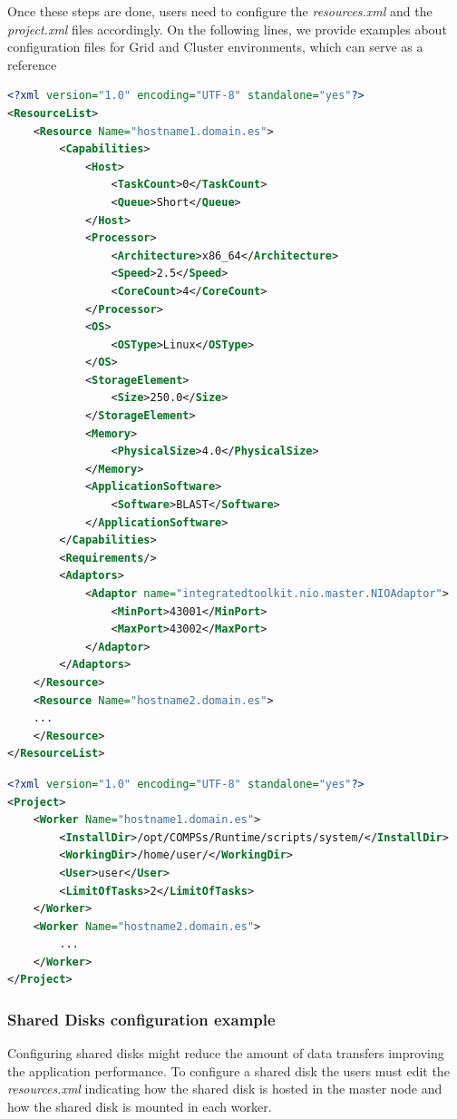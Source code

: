 Once these steps are done, users need to configure the \textit{resources.xml} and the \textit{project.xml} files accordingly.
On the following lines, we provide examples about configuration files for Grid and Cluster environments, 
which can serve as a reference

\begin{lstlisting}[language=xml]
<?xml version="1.0" encoding="UTF-8" standalone="yes"?>
<ResourceList>
    <Resource Name="hostname1.domain.es">
        <Capabilities>
            <Host>
                <TaskCount>0</TaskCount>
                <Queue>Short</Queue>
            </Host>
            <Processor>
                <Architecture>x86_64</Architecture>
                <Speed>2.5</Speed>
                <CoreCount>4</CoreCount>
            </Processor>
            <OS>
                <OSType>Linux</OSType>
            </OS>
            <StorageElement>
                <Size>250.0</Size>
            </StorageElement>
            <Memory>
                <PhysicalSize>4.0</PhysicalSize>
            </Memory>
            <ApplicationSoftware>
                <Software>BLAST</Software>
            </ApplicationSoftware>
        </Capabilities>
        <Requirements/>
        <Adaptors>
            <Adaptor name="integratedtoolkit.nio.master.NIOAdaptor">
                <MinPort>43001</MinPort>
                <MaxPort>43002</MaxPort>
            </Adaptor>
        </Adaptors>
    </Resource>
    <Resource Name="hostname2.domain.es">
	...
    </Resource>
</ResourceList>
\end{lstlisting}

\begin{lstlisting}[language=xml]
<?xml version="1.0" encoding="UTF-8" standalone="yes"?>
<Project>
    <Worker Name="hostname1.domain.es">
        <InstallDir>/opt/COMPSs/Runtime/scripts/system/</InstallDir>
        <WorkingDir>/home/user/</WorkingDir>
        <User>user</User>
        <LimitOfTasks>2</LimitOfTasks>
    </Worker>
    <Worker Name="hostname2.domain.es">
        ...
    </Worker>
</Project>
\end{lstlisting}


\subsubsection{Shared Disks configuration example}
Configuring shared disks might reduce the amount of data transfers improving the application performance. To configure a 
shared disk the users must edit the \textit{resources.xml} indicating how the shared disk is hosted in the master node 
and how the shared disk is mounted in each worker. 

